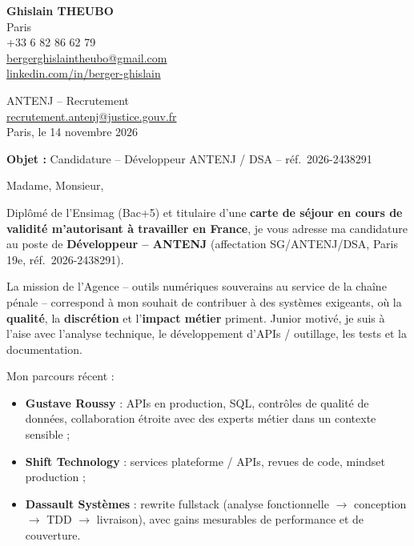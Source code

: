 \documentclass[11pt,a4paper]{article}
\begin{document}

\noindent\textbf{Ghislain THEUBO}\\
Paris\\
+33 6 82 86 62 79\\
\href{mailto:bergerghislaintheubo@gmail.com}{bergerghislaintheubo@gmail.com}\\
\href{https://www.linkedin.com/in/berger-ghislain}{linkedin.com/in/berger-ghislain}

\vspace{0.8em}
\begin{flushright}
ANTENJ -- Recrutement\\
\href{mailto:recrutement.antenj@justice.gouv.fr}{recrutement.antenj@justice.gouv.fr}\\
Paris, le 14 novembre 2026
\end{flushright}

\vspace{0.6em}
\noindent\textbf{Objet :} Candidature -- D\'eveloppeur ANTENJ / DSA -- r\'ef.\ 2026-2438291

\vspace{1em}
\noindent Madame, Monsieur,

\vspace{0.6em}
\noindent Dipl\^om\'e de l'Ensimag (Bac+5) et titulaire d'une \textbf{carte de s\'ejour en cours de validit\'e m'autorisant \`a travailler en France}, je vous adresse ma candidature au poste de \textbf{D\'eveloppeur -- ANTENJ} (affectation SG/ANTENJ/DSA, Paris 19e, r\'ef.\ 2026-2438291).

\vspace{0.5em}
\noindent La mission de l'Agence -- outils num\'eriques souverains au service de la cha\^ine p\'enale -- correspond \`a mon souhait de contribuer \`a des syst\`emes exigeants, o\`u la \textbf{qualit\'e}, la \textbf{discr\'etion} et l'\textbf{impact m\'etier} priment. Junior motiv\'e, je suis \`a l'aise avec l'analyse technique, le d\'eveloppement d'APIs / outillage, les tests et la documentation.

\vspace{0.5em}
\noindent Mon parcours r\'ecent :
\begin{itemize}
  \item \textbf{Gustave Roussy} : APIs en production, SQL, contr\^oles de qualit\'e de donn\'ees, collaboration \'etroite avec des experts m\'etier dans un contexte sensible ;
  \item \textbf{Shift Technology} : services plateforme / APIs, revues de code, mindset production ;
  \item \textbf{Dassault Syst\`emes} : rewrite fullstack (analyse fonctionnelle $\rightarrow$ conception $\rightarrow$ TDD $\rightarrow$ livraison), avec gains mesurables de performance et de couverture.
\end{itemize}
\end{document}
